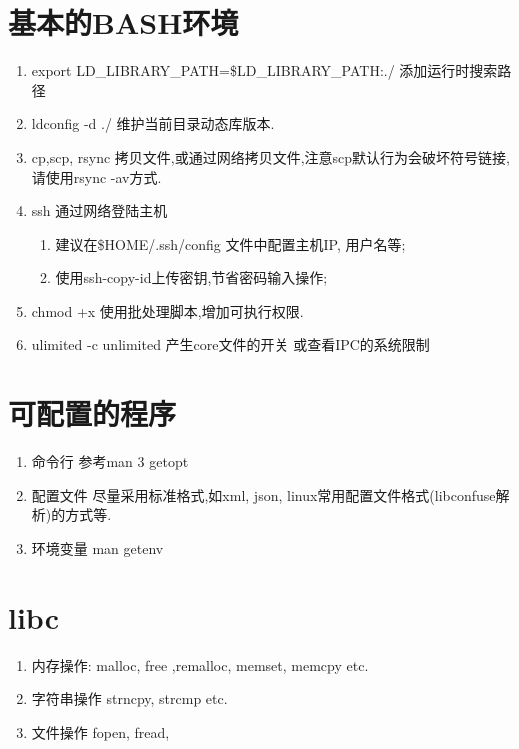 \section{基本的BASH环境}
        \begin{enumerate}
        \item  export LD\_LIBRARY\_PATH=\$LD\_LIBRARY\_PATH:./
                添加运行时搜索路径
        \item ldconfig -d ./
                维护当前目录动态库版本.
        \item cp,scp, rsync
                拷贝文件,或通过网络拷贝文件,注意scp默认行为会破坏符号链接, 请使用rsync -av方式.
        \item ssh 通过网络登陆主机
                \begin{enumerate}
                \item 建议在\$HOME/.ssh/config 文件中配置主机IP, 用户名等;
                \item 使用ssh-copy-id上传密钥,节省密码输入操作;
                \end{enumerate}
        \item  chmod +x
                使用批处理脚本,增加可执行权限.
        \item ulimited -c unlimited
                产生core文件的开关
                或查看IPC的系统限制
        \end{enumerate}

\section{可配置的程序}
        \begin{enumerate}
        \item  命令行
                参考man 3 getopt
        \item 配置文件
                尽量采用标准格式,如xml, json, linux常用配置文件格式(libconfuse解析)的方式等.
        \item  环境变量
                man getenv
        \end{enumerate}

\section{libc}

\begin{enumerate}
\item 内存操作: malloc, free ,remalloc, memset, memcpy etc.
\item 字符串操作 strncpy, strcmp etc.
\item 文件操作 fopen, fread,
\end{enumerate}

